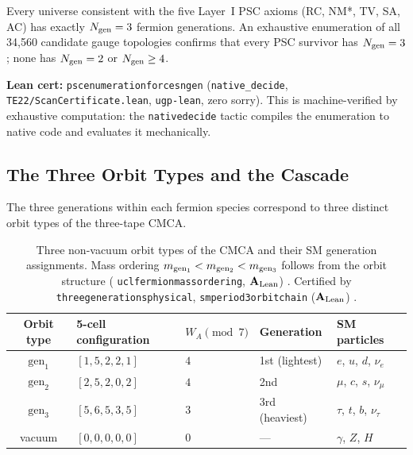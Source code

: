 \documentclass[11pt,openany]{book}
\theoremstyle{remark}
\newcommand{\lean}[1]{%
  \penalty-100
  \begingroup\def\_{\textunderscore\allowbreak}\texttt{#1}\endgroup}
\newcommand{\CatAL}{\ensuremath{\textbf{A}_{\rm Lean}}}
\begin{document}
\begin{tcolorbox}[colback=orange!5,colframe=orange!60,title={Theorem: Three-Generation Uniqueness (\CatAL)}]
Every universe consistent with the five Layer~I PSC axioms (RC, NM*, TV, SA, AC) has
exactly $N_{\rm gen} = 3$ fermion generations. An exhaustive enumeration of all 34,560
candidate gauge topologies confirms that every PSC survivor has $N_{\rm gen}=3$; none has
$N_{\rm gen}=2$ or $N_{\rm gen}\geq 4$.

\textbf{Lean cert:} \lean{psc\_enumeration\_forces\_ngen\_3}
(\texttt{native\_decide}, \texttt{TE22/ScanCertificate.lean}, \texttt{ugp-lean}, zero sorry).
This is machine-verified by exhaustive computation: the \lean{native\_decide} tactic compiles
the enumeration to native code and evaluates it mechanically.
\end{tcolorbox}

\subsection*{The Three Orbit Types and the Cascade}

The three generations within each fermion species correspond to three distinct orbit
types of the three-tape CMCA.

\begin{table}[htbp]
\centering
\caption{Three non-vacuum orbit types of the CMCA and their SM generation assignments.
Mass ordering $m_{\rm gen_1} < m_{\rm gen_2} < m_{\rm gen_3}$ follows from the orbit
structure (\lean{ucl\_fermion\_mass\_ordering}, \CatAL) \cite{Spivack2025UGP}.
Certified by \lean{three\_generations\_physical}, \lean{sm\_period3\_orbit\_chain}
(\CatAL) \cite{SpivackBraidAtlas,SpivackGTEQCDStructure}.}
\label{tab:orbit_types}
\setlength{\tabcolsep}{5pt}
\begin{tabular}{cllll}
\toprule
Orbit type & 5-cell configuration & $W_A\!\pmod{7}$ & Generation & SM particles \\
\midrule
$\text{gen}_1$ & $[1,5,2,2,1]$ & $4$ & 1st (lightest) & $e$, $u$, $d$, $\nu_e$ \\
$\text{gen}_2$ & $[2,5,2,0,2]$ & $4$ & 2nd & $\mu$, $c$, $s$, $\nu_\mu$ \\
$\text{gen}_3$ & $[5,6,5,3,5]$ & $3$ & 3rd (heaviest) & $\tau$, $t$, $b$, $\nu_\tau$ \\
vacuum & $[0,0,0,0,0]$ & $0$ & --- & $\gamma$, $Z$, $H$ \\
\bottomrule
\end{tabular}
\end{table}
\end{document}

